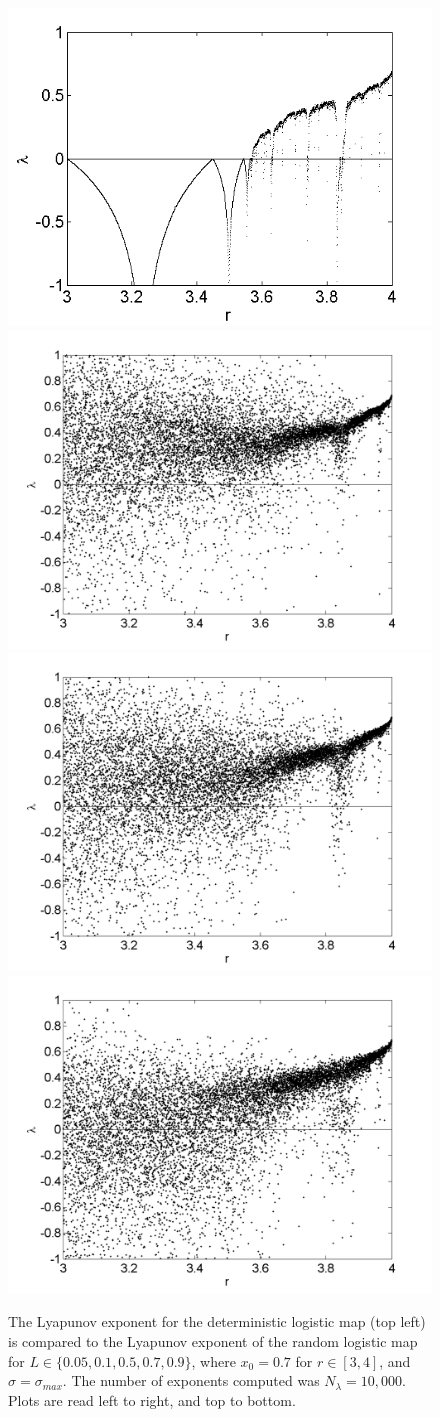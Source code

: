 \begin{figure}[!h]
\caption[Lyapunov exponent in the random logistic map compared to the
deterministic map, $\sigma=\sigma_{max}$]{The Lyapunov exponent for the deterministic
  logistic map (top left) is compared
  to the Lyapunov exponent of the random logistic map for $L \in
  \{0.05,0.1,0.5,0.7,0.9\}$, where $x_0=0.7$ for $r \in [3,4]$, and
  $\sigma=\sigma_{max}$. The number of exponents computed was $N_\lambda=10,000$. Plots are read left to right, and top to bottom. }\label{fig:rloglyap2}
\centering
\includegraphics[width=.5\textwidth]{figs/det_log_lyap.png}\hfill
\includegraphics[width=.5\textwidth]{figs/rlog_lyap_L_005.png}\\
\includegraphics[width=.5\textwidth]{figs/rlog_lyap_L_01.png}\hfill
\includegraphics[width=.5\textwidth]{figs/rlog_lyap_L_05.png}\\

\end{figure}
